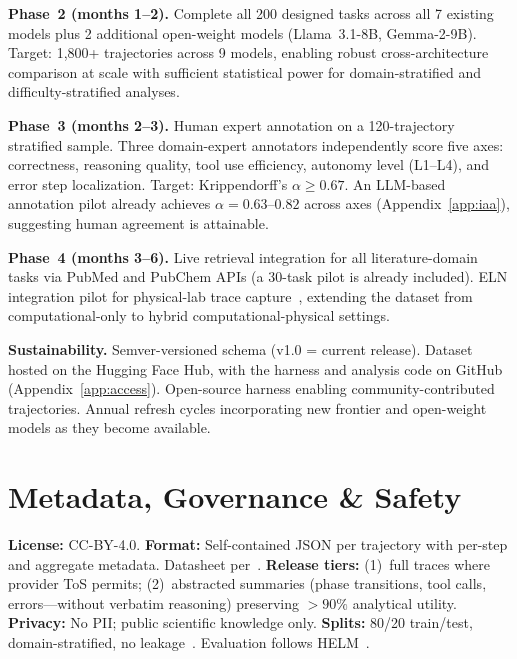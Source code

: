 \documentclass{article}
\begin{document}
\textbf{Phase~2 (months 1--2).} Complete all 200 designed tasks across all 7 existing models plus 2 additional open-weight models (Llama~3.1-8B, Gemma-2-9B). Target: 1,800+ trajectories across 9 models, enabling robust cross-architecture comparison at scale with sufficient statistical power for domain-stratified and difficulty-stratified analyses.

\textbf{Phase~3 (months 2--3).} Human expert annotation on a 120-trajectory stratified sample. Three domain-expert annotators independently score five axes: correctness, reasoning quality, tool use efficiency, autonomy level (L1--L4), and error step localization. Target: Krippendorff's $\alpha \geq 0.67$. An LLM-based annotation pilot already achieves $\alpha{=}0.63$--$0.82$ across axes (Appendix~\ref{app:iaa}), suggesting human agreement is attainable.

\textbf{Phase~4 (months 3--6).} Live retrieval integration for all literature-domain tasks via PubMed and PubChem APIs (a 30-task pilot is already included). ELN integration pilot for physical-lab trace capture~\citep{dirnagl2016eln,abolhasani2023selfdriving}, extending the dataset from computational-only to hybrid computational-physical settings.

\textbf{Sustainability.} Semver-versioned schema (v1.0 = current release). Dataset hosted on the Hugging Face Hub, with the harness and analysis code on GitHub (Appendix~\ref{app:access}). Open-source harness enabling community-contributed trajectories. Annual refresh cycles incorporating new frontier and open-weight models as they become available.

\vspace{-0.3em}
\section{Metadata, Governance \& Safety}
\vspace{-0.3em}

\textbf{License:} CC-BY-4.0. \textbf{Format:} Self-contained JSON per trajectory with per-step and aggregate metadata. Datasheet per~\citet{gebru2021datasheets}. \textbf{Release tiers:} (1)~full traces where provider ToS permits; (2)~abstracted summaries (phase transitions, tool calls, errors---without verbatim reasoning) preserving ${>}90\%$ analytical utility. \textbf{Privacy:} No PII; public scientific knowledge only. \textbf{Splits:} 80/20 train/test, domain-stratified, no leakage~\citep{kapoor2023leakage}. Evaluation follows HELM~\citep{liang2023helm}.
\end{document}
